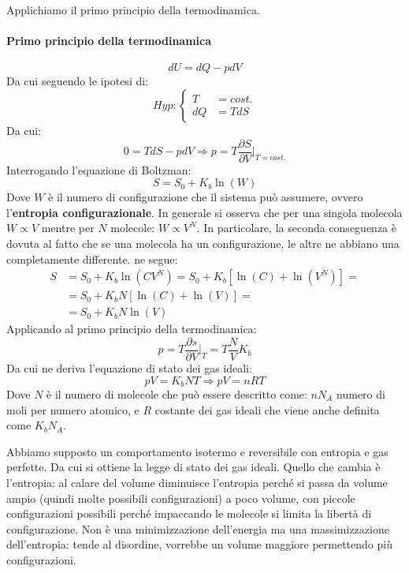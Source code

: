 Applichiamo il primo principio della termodinamica.

\paragraph{Primo principio della termodinamica}
\begin{equation}
dU = dQ - pdV
\end{equation}
Da cui seguendo le ipotesi di:
\begin{equation}
Hyp:%
\begin{cases}
T &= cost.\\
dQ &= TdS
\end{cases}
\end{equation}
Da cui:
\begin{equation}
0 = TdS - pdV \Rightarrow p = T\frac{\partial S}{\partial V}\Big|_{T = cost.}
\end{equation}
Interrogando l'equazione di Boltzman:
\begin{equation}
S = S_0 + K_b \ln(W)
\end{equation}
Dove $W$ è il numero di configurazione che il sistema può assumere, ovvero l'\textbf{entropia configurazionale}.
In generale si osserva che per una singola molecola $W \propto V$ mentre per $N$ molecole: $W \propto V^N$.
In particolare, la seconda conseguenza è dovuta al fatto che se una molecola ha un configurazione, le altre ne abbiano una completamente differente.
ne segue:
\begin{equation}
\begin{split}
S &= S_0 + K_b\ln(CV^N) = S_0 + K_b\left[\ln(C) + \ln(V^N)\right] =\\
&= S_0 + K_b N\left[\ln(C) + \ln(V)\right]=\\
&= S_0 + K_b N \ln(V)
\end{split}
\end{equation}
Applicando al primo principio della termodinamica:
\begin{equation}
p = T\frac{\partial s}{\partial V}\Big|_T = T \frac{N}{V}K_b
\end{equation}
Da cui ne deriva l'equazione di stato dei gas ideali:
\begin{equation}
pV = K_bNT \Rightarrow pV = nRT
\end{equation}
Dove $N$ è il numero di molecole che può essere descritto come: $n N_A$ numero di moli per numero atomico, e $R$ costante dei gas ideali che viene anche definita come $K_b N_A$.

Abbiamo supposto un comportamento isotermo e reversibile con entropia e gas perfette. Da cui si ottiene la legge di stato dei gas ideali.
Quello che cambia è l'entropia: al calare del volume diminuisce l'entropia perché si passa da volume ampio (quindi molte possibili configurazioni) a poco volume, con piccole configurazioni possibili perché impaccando le molecole si limita la libertà di configurazione.
Non è una minimizzazione dell'energia ma una massimizzazione dell'entropia: tende al disordine, vorrebbe un volume maggiore permettendo più configurazioni.

